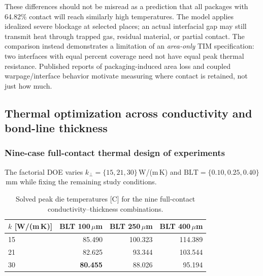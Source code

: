 \documentclass[10pt,a4paper]{article}
\newcommand{\BLT}{\mathrm{BLT}}
\newcommand{\kperp}{k_{\perp}}
\begin{document}
These differences should not be misread as a prediction that all packages with 64.82\% contact
will reach similarly high temperatures. The model applies idealized severe blockage at selected places;
an actual interfacial gap may still transmit heat through trapped gas, residual material, or partial contact.
The comparison instead demonstrates a limitation of an \emph{area-only} TIM specification:
two interfaces with equal percent coverage need not have equal peak thermal resistance.
Published reports of packaging-induced area loss \citep{yi2025} and coupled warpage/interface behavior
\citep{du2026,yenigun2026} motivate measuring where contact is retained, not just how much.


\subsection{Thermal optimization across conductivity and bond-line thickness}
\subsubsection{Nine-case full-contact thermal design of experiments}
The factorial DOE varies $\kperp=\{15,21,30\}$\,W/(m\,K)
and $\BLT=\{0.10,0.25,0.40\}$\,mm while fixing the remaining study conditions.
\begin{table}[htbp]\centering
\caption{Solved peak die temperatures [\textdegree C] for the nine full-contact conductivity--thickness combinations.}
\label{tab:v4b}
\small
\begin{tabular}{@{}lrrr@{}}\toprule
$k$ [W/(m\,K)] & BLT 100\,$\mu$m & BLT 250\,$\mu$m & BLT 400\,$\mu$m\\\midrule
15 & 85.490 & 100.323 & 114.389\\
21 & 82.625 & 93.344 & 103.544\\
30 & \textbf{80.455} & 88.026 & 95.194\\\bottomrule
\end{tabular}
\end{table}
\end{document}
